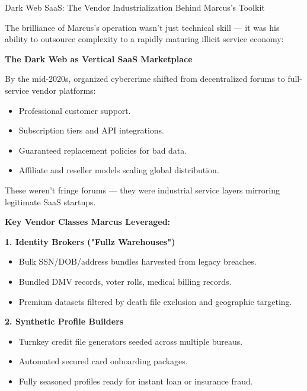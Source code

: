 \begin{HistoricalSidebar}{Dark Web SaaS: The Vendor Industrialization Behind Marcus's Toolkit}

    The brilliance of Marcus's operation wasn’t just technical skill — it was his ability to outsource complexity to a rapidly maturing illicit service economy:
    
    \medskip
    
    \textbf{The Dark Web as Vertical SaaS Marketplace}
    
    By the mid-2020s, organized cybercrime shifted from decentralized forums to full-service vendor platforms:
    
    \begin{itemize}
        \item Professional customer support.
        \item Subscription tiers and API integrations.
        \item Guaranteed replacement policies for bad data.
        \item Affiliate and reseller models scaling global distribution.
    \end{itemize}
    
    These weren’t fringe forums — they were industrial service layers mirroring legitimate SaaS startups.
    
    \medskip
    
    \textbf{Key Vendor Classes Marcus Leveraged:}
    
    \textbf{1. Identity Brokers ("Fullz Warehouses")}
    
    \begin{itemize}
        \item Bulk SSN/DOB/address bundles harvested from legacy breaches.
        \item Bundled DMV records, voter rolls, medical billing records.
        \item Premium datasets filtered by death file exclusion and geographic targeting.
    \end{itemize}
    
    \textbf{2. Synthetic Profile Builders}
    
    \begin{itemize}
        \item Turnkey credit file generators seeded across multiple bureaus.
        \item Automated secured card onboarding packages.
        \item Fully seasoned profiles ready for instant loan or insurance fraud.
    \end{itemize}
    

\end{HistoricalSidebar}
